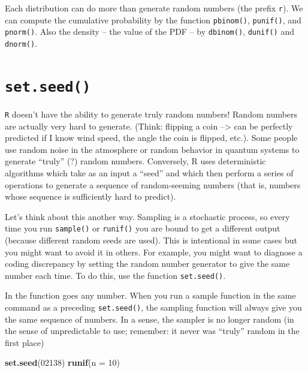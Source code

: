 \documentclass[]{book}
\newenvironment{Shaded}{\begin{snugshade}}{\end{snugshade}}
\newcommand{\DataTypeTok}[1]{\textcolor[rgb]{0.13,0.29,0.53}{#1}}
\newcommand{\DecValTok}[1]{\textcolor[rgb]{0.00,0.00,0.81}{#1}}
\newcommand{\KeywordTok}[1]{\textcolor[rgb]{0.13,0.29,0.53}{\textbf{#1}}}
\newcommand{\NormalTok}[1]{#1}
\theoremstyle{definition}
\theoremstyle{definition}
\theoremstyle{definition}
\theoremstyle{remark}
\begin{document}
\begin{Shaded}
\begin{Highlighting}[]
\begin{Shaded}
\begin{Highlighting}[]
\begin{Shaded}
\begin{Highlighting}[]
Each distribution can do more than generate random numbers (the prefix \texttt{r}). We can compute the cumulative probability by the function \texttt{pbinom()}, \texttt{punif()}, and \texttt{pnorm()}. Also the density -- the value of the PDF -- by \texttt{dbinom()}, \texttt{dunif()} and \texttt{dnorm()}.

\hypertarget{set.seed}{%
\section{\texorpdfstring{\texttt{set.seed()}}{set.seed()}}\label{set.seed}}

\texttt{R} doesn't have the ability to generate truly random numbers! Random numbers are actually very hard to generate. (Think: flipping a coin --\textgreater{} can be perfectly predicted if I know wind speed, the angle the coin is flipped, etc.). Some people use random noise in the atmosphere or random behavior in quantum systems to generate ``truly'' (?) random numbers. Conversely, R uses deterministic algorithms which take as an input a ``seed'' and which then perform a series of operations to generate a sequence of random-seeming numbers (that is, numbers whose sequence is sufficiently hard to predict).

Let's think about this another way. Sampling is a stochastic process, so every time you run \texttt{sample()} or \texttt{runif()} you are bound to get a different output (because different random seeds are used). This is intentional in some cases but you might want to avoid it in others. For example, you might want to diagnose a coding discrepancy by setting the random number generator to give the same number each time. To do this, use the function \texttt{set.seed()}.

In the function goes any number. When you run a sample function in the same command as a preceding \texttt{set.seed()}, the sampling function will always give you the same sequence of numbers. In a sense, the sampler is no longer random (in the sense of unpredictable to use; remember: it never was ``truly'' random in the first place)

\begin{Shaded}
\begin{Highlighting}[]
\KeywordTok{set.seed}\NormalTok{(}\DecValTok{02138}\NormalTok{)}
\KeywordTok{runif}\NormalTok{(}\DataTypeTok{n =} \DecValTok{10}\NormalTok{)}
\end{Highlighting}
\end{Shaded}


\end{Highlighting}
\end{Shaded}
\end{Highlighting}
\end{Shaded}
\end{Highlighting}
\end{Shaded}
\end{document}
